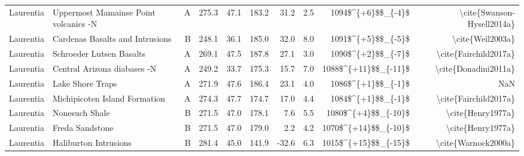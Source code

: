 \begin{longtable}{p{1 in}p{1 in}rrrrrrrr}
                     Laurentia &            Uppermost Mamainse Point volcanics -N &      A &     275.3 &      47.1 & 183.2 &  31.2 &       2.5 &     1094\$\textasciicircum \{+6\}\$\$\_\{-4\}\$ &                         \textbackslash cite\{Swanson-Hysell2014a\} \\
                     Laurentia &                  Cardenas Basalts and Intrusions &      B &     248.1 &      36.1 & 185.0 &  32.0 &       8.0 &     1091\$\textasciicircum \{+5\}\$\$\_\{-5\}\$ &                                   \textbackslash cite\{Weil2003a\} \\
                     Laurentia &                         Schroeder Lutsen Basalts &      A &     269.1 &      47.5 & 187.8 &  27.1 &       3.0 &     1090\$\textasciicircum \{+2\}\$\$\_\{-7\}\$ &                              \textbackslash cite\{Fairchild2017a\} \\
                     Laurentia &                      Central Arizona diabases -N &      A &     249.2 &      33.7 & 175.3 &  15.7 &       7.0 &   1088\$\textasciicircum \{+11\}\$\$\_\{-11\}\$ &                               \textbackslash cite\{Donadini2011a\} \\
                     Laurentia &                                 Lake Shore Traps &      A &     271.9 &      47.6 & 186.4 &  23.1 &       4.0 &     1086\$\textasciicircum \{+1\}\$\$\_\{-1\}\$ &                                                NaN \\
                     Laurentia &                    Michipicoten Island Formation &      A &     274.3 &      47.7 & 174.7 &  17.0 &       4.4 &     1084\$\textasciicircum \{+1\}\$\$\_\{-1\}\$ &                              \textbackslash cite\{Fairchild2017a\} \\
                     Laurentia &                                   Nonesuch Shale &      B &     271.5 &      47.0 & 178.1 &   7.6 &       5.5 &    1080\$\textasciicircum \{+4\}\$\$\_\{-10\}\$ &                                  \textbackslash cite\{Henry1977a\} \\
                     Laurentia &                                  Freda Sandstone &      B &     271.5 &      47.0 & 179.0 &   2.2 &       4.2 &   1070\$\textasciicircum \{+14\}\$\$\_\{-10\}\$ &                                  \textbackslash cite\{Henry1977a\} \\
                     Laurentia &                            Haliburton Intrusions &      B &     281.4 &      45.0 & 141.9 & -32.6 &       6.3 &   1015\$\textasciicircum \{+15\}\$\$\_\{-15\}\$ &                                \textbackslash cite\{Warnock2000a\} \\

\end{longtable}
